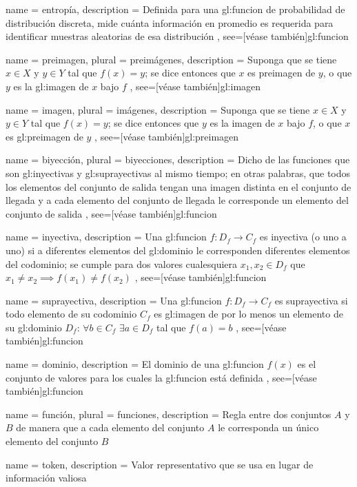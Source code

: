 {
  name = entropía,
  description = {
    Definida para una \gls{gl:funcion} de probabilidad de distribución discreta,
    mide cuánta información en promedio es requerida para identificar
    muestras aleatorias de esa distribución%
  },
  see=[véase también]{gl:funcion}
}

{
  name = preimagen,
  plural = preimágenes,
  description = {
    Suponga que se tiene $x \in X$ y $y \in Y$ tal que $f(x) = y$;
    se dice entonces que $x$ es preimagen de $y$, o que
    $y$ es la \gls{gl:imagen} de $x$ bajo $f$%
  },
  see=[véase también]{gl:imagen}
}

{
  name = imagen,
  plural = imágenes,
  description = {
    Suponga que se tiene $x \in X$ y $y \in Y$ tal que $f(x) = y$;
    se dice entonces que $y$ es la imagen de $x$ bajo $f$,
    o que $x$ es \gls{gl:preimagen} de $y$%
  },
  see=[véase también]{gl:preimagen}
}

{
  name = biyección,
  plural = biyecciones,
  description = {
    Dicho de las funciones que son \glspl{gl:inyectiva} y
    \glspl{gl:suprayectiva} al mismo tiempo; en otras palabras, que todos los
    elementos del conjunto de salida tengan una imagen distinta en el conjunto
    de llegada y a cada elemento del conjunto de llegada le corresponde
    un elemento del conjunto de salida%
  },
  see=[véase también]{gl:funcion}
}

{
  name = inyectiva,
  description = {
    Una \gls{gl:funcion} $f:D_f \rightarrow C_f$ es inyectiva (o uno a
    uno) si a diferentes elementos del \gls{gl:dominio} le corresponden
    diferentes elementos del codominio; se cumple para dos
    valores cualesquiera $x_1, x_2 \in D_f$ que
    $x_1 \neq x_2 \implies f(x_1) \neq f(x_2)$%
  },
  see=[véase también]{gl:funcion}
}

{
  name = suprayectiva,
  description = {
    Una \gls{gl:funcion} $f:D_f \rightarrow C_f$ es suprayectiva si
    todo elemento de su codominio $C_f$ es \gls{gl:imagen} de
    por lo menos un elemento de su \gls{gl:dominio} $D_f$: $\forall b \in C_f$
    $\exists a \in D_f$ tal que $f(a)=b$%
  },
  see=[véase también]{gl:funcion}
}

{
  name = dominio,
  description = {
    El dominio de una \gls{gl:funcion} $f(x)$ es el conjunto de valores
    para los cuales la \gls{gl:funcion} está definida%
  },
  see=[véase también]{gl:funcion}
}

{
  name = función,
  plural = funciones,
  description = {
    Regla entre dos conjuntos $A$ y $B$ de manera que a cada elemento del
    conjunto $A$ le corresponda un único elemento del conjunto $B$%
  }
}

{
  name = token,
  description = {
    Valor representativo que se usa en lugar de información valiosa%
  }
}

\glsaddall
